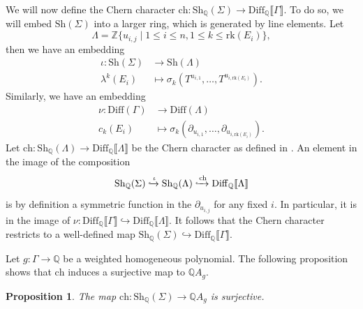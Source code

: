 \documentclass[oneside]{amsart}
\theoremstyle{plain}
\newtheorem{proposition}[theorem]{Proposition}
\theoremstyle{definition}
\newcommand{\Z}{{\mathbb{Z}}}
\newcommand{\Q}{{\mathbb{Q}}}
\newcommand{\rk}{{\mathrm{rk}}}
\newcommand{\Diff}{{\mathrm{Diff}}}
\newcommand{\Sh}{{\mathrm{Sh}}}
\newcommand{\ch}{{\mathrm{ch}}}
\begin{document}
We will now define the Chern character $\ch: \Sh_\Q(\Sigma) \to \Diff_\Q\llbracket \Gamma \rrbracket$. To do so, we will embed $\Sh(\Sigma)$ into a larger ring, which is generated by line elements.
Let
\[\Lambda = \Z\{u_{i, j} \mid 1 \leq i \leq n, 1 \leq k \leq \rk(E_i)\},\]
then we have an embedding
\begin{align*}
    \iota: \Sh(\Sigma) &\to \Sh(\Lambda)\\
    \lambda^k(E_i) &\mapsto \sigma_k(T^{u_{i, 1}}, \dots, T^{u_{i, \rk(E_i)}}).
\end{align*}
Similarly, we have an embedding
\begin{align*}
    \nu: \Diff(\Gamma)&\to \Diff(\Lambda)\\
    c_k(E_i) &\mapsto \sigma_k(\partial_{u_{i, 1}}, \dots, \partial_{u_{i, \rk(E_i)}}).
\end{align*}
Let $\ch: \Sh_\Q(\Lambda) \to \Diff_\Q \llbracket \Lambda\rrbracket$
be the Chern character as defined in .
An element in the image of the composition 
\[\Sh_\Q(\Sigma) \xhookrightarrow{\iota} \Sh_\Q(\Lambda) \xhookrightarrow{\ch} \Diff_\Q\llbracket \Lambda\rrbracket\]
is by definition a symmetric function in the $\partial_{u_{i, j}}$ for any fixed $i$. In particular,
it is in the image of $\nu: \Diff_\Q\llbracket \Gamma \rrbracket \hookrightarrow \Diff_\Q\llbracket \Lambda \rrbracket$. It follows that the Chern character restricts to a well-defined map
$\Sh_\Q(\Sigma) \hookrightarrow \Diff_\Q\llbracket\Gamma\rrbracket$.


Let $g: \Gamma \to \Q$ be a weighted homogeneous polynomial. The following proposition shows that $\ch$ induces a surjective map to $\Q A_g$.

\begin{proposition}
    The map $\ch: \Sh_\Q(\Sigma) \to \Q A_g$ is surjective.
\end{proposition}
\end{document}

